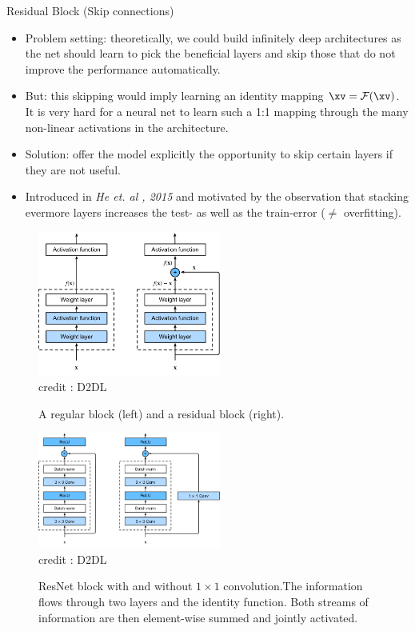 \begin{vbframe}{Residual Block (Skip connections)}
    \begin{itemize}
        \item Problem setting: theoretically, we could build infinitely deep architectures as the net should learn to pick the beneficial layers and skip those that do not improve the performance automatically.
        \item But: this skipping would imply learning an identity mapping $\xv = \mathcal{F}(\xv)$. It is very hard for a neural net to learn such a 1:1 mapping through the many non-linear activations in the architecture.
        \item Solution: offer the model explicitly the opportunity to skip certain layers if they are not useful.
        \item Introduced in \textit{He et. al , 2015} and motivated by the observation that stacking evermore layers increases the test- as well as the train-error ($\neq$ overfitting).
    \end{itemize}
\framebreak
 
 \begin{figure}
  \centering
    \includegraphics[width=6cm]{plots/moderncnn/residual-block.png}
    \tiny{\\ credit : D2DL}
    \caption{A regular block (left) and a residual block (right).}
  \end{figure}

  \begin{figure}
  \centering
    \includegraphics[width=6cm]{plots/moderncnn/resnet-block.png}
    \tiny{\\ credit : D2DL}
    \caption{ResNet block with and without $1 \times 1$ convolution.The information flows through two layers and the identity function. Both streams of information are then element-wise summed and jointly activated.}
  \end{figure}


\end{vbframe}

